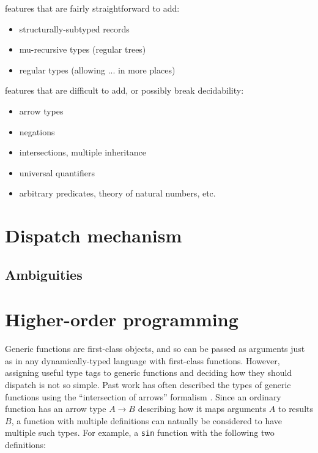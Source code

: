 features that are fairly straightforward to add:

\vspace{-2ex}
\begin{singlespace}
\begin{itemize}
\item structurally-subtyped records
\item mu-recursive types (regular trees)
\item regular types (allowing ... in more places)
\end{itemize}
\end{singlespace}

\noindent
features that are difficult to add, or possibly break decidability:

\vspace{-2ex}
\begin{singlespace}
\begin{itemize}
\item arrow types
\item negations
\item intersections, multiple inheritance
\item universal quantifiers
\item arbitrary predicates, theory of natural numbers, etc.
\end{itemize}
\end{singlespace}

\section{Dispatch mechanism}

\subsection{Ambiguities}

\section{Higher-order programming}

Generic functions are first-class objects, and so can be passed as arguments
just as in any dynamically-typed language with first-class functions.
However, assigning useful type tags to generic functions and deciding how
they should dispatch is not so simple. Past work has often described the
types of generic functions using the ``intersection of arrows'' formalism
\cite{RonchiDellaRocca:1988:PTS:55079.55086} \cite{Dunfield:2012:EIU:2364527.2364534}
\cite{boundedquant} \cite{Castagna:1995:COF:203496.203510}. Since an ordinary
function has an arrow type $A\rightarrow B$ describing how it maps arguments
$A$ to results $B$, a function with multiple definitions can natually be
considered to have multiple such types. For example, a \texttt{sin} function
with the following two definitions:

